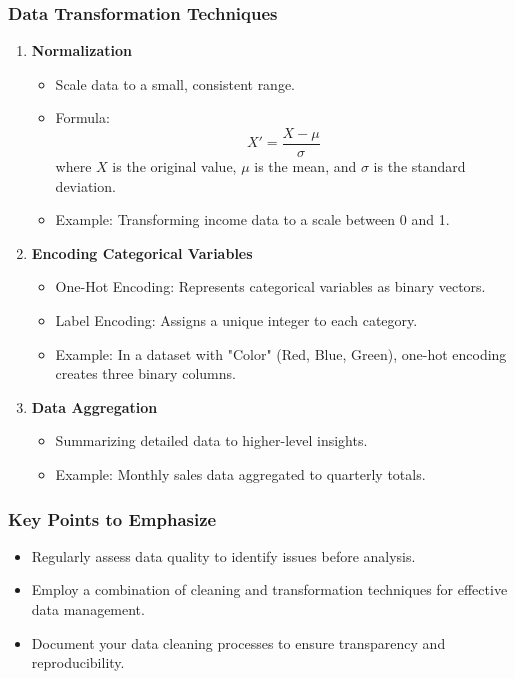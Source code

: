 \documentclass{beamer}
\begin{document}
\begin{frame}[fragile]
    \frametitle{Data Transformation Techniques}
    \begin{enumerate}
        \item \textbf{Normalization}
        \begin{itemize}
            \item Scale data to a small, consistent range.
            \item Formula: 
            \[
            X' = \frac{X - \mu}{\sigma}
            \]
            where $X$ is the original value, $\mu$ is the mean, and $\sigma$ is the standard deviation.
            \item Example: Transforming income data to a scale between 0 and 1.
        \end{itemize}
        \item \textbf{Encoding Categorical Variables}
        \begin{itemize}
            \item One-Hot Encoding: Represents categorical variables as binary vectors.
            \item Label Encoding: Assigns a unique integer to each category.
            \item Example: In a dataset with "Color" (Red, Blue, Green), one-hot encoding creates three binary columns.
        \end{itemize}
        \item \textbf{Data Aggregation}
        \begin{itemize}
            \item Summarizing detailed data to higher-level insights.
            \item Example: Monthly sales data aggregated to quarterly totals.
        \end{itemize}
    \end{enumerate}
\end{frame}

\begin{frame}[fragile]
    \frametitle{Key Points to Emphasize}
    \begin{itemize}
        \item Regularly assess data quality to identify issues before analysis.
        \item Employ a combination of cleaning and transformation techniques for effective data management.
        \item Document your data cleaning processes to ensure transparency and reproducibility.
    \end{itemize}
\end{frame}
\end{document}
